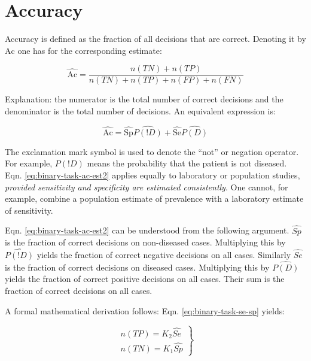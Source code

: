 \documentclass[
]{book}
\begin{document}
\hypertarget{accuracy}{%
\section{Accuracy}\label{accuracy}}

Accuracy is defined as the fraction of all decisions that are correct. Denoting it by \(\text{Ac}\) one has for the corresponding estimate:

\begin{equation} 
\widehat{\text{Ac}}=\frac{n(TN)+n(TP)}{n(TN)+n(TP)+n(FP)+n(FN)}
\label{eq:binary-task-ac-est}
\end{equation}

Explanation: the numerator is the total number of correct decisions and the denominator is the total number of decisions. An equivalent expression is:

\begin{equation} 
\widehat{\text{Ac}}=\widehat{\text{Sp}}\widehat{P(!D)}+\widehat{\text{Se}}\widehat{P(D)}
\label{eq:binary-task-ac-est2}
\end{equation}

The exclamation mark symbol is used to denote the ``not'' or negation operator. For example, \(P(!D)\) means the probability that the patient is not diseased. Eqn. \eqref{eq:binary-task-ac-est2} applies equally to laboratory or population studies, \emph{provided sensitivity and specificity are estimated consistently}. One cannot, for example, combine a population estimate of prevalence with a laboratory estimate of sensitivity.

Eqn. \eqref{eq:binary-task-ac-est2} can be understood from the following argument. \(\widehat{Sp}\) is the fraction of correct decisions on non-diseased cases. Multiplying this by \(\widehat{P(!D)}\) yields the fraction of correct negative decisions on all cases. Similarly \(\widehat{Se}\) is the fraction of correct decisions on diseased cases. Multiplying this by \(\widehat{P(D)}\) yields the fraction of correct positive decisions on all cases. Their sum is the fraction of correct decisions on all cases.

A formal mathematical derivation follows: Eqn. \eqref{eq:binary-task-se-sp} yields:

\begin{equation} 
\left.
\begin{aligned}  
n(TP)=K_2 \widehat{Se}\\ 
n(TN)=K_1 \widehat{Sp}
\end{aligned}
\right \}
\label{eq:binary-task-ntp-ntn}
\end{equation}
\end{document}
